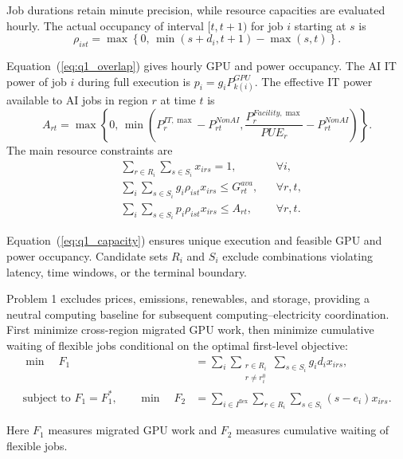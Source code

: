 Job durations retain minute precision, while resource capacities are evaluated hourly.
The actual occupancy of interval $[t,t+1)$ for job $i$ starting at $s$ is
\begin{equation}
	\rho_{ist}
	=
	\max\left\{
	0,\,
	\min(s+d_i,t+1)-\max(s,t)
	\right\}.
	\label{eq:q1_overlap}
\end{equation}

Equation~(\ref{eq:q1_overlap}) gives hourly GPU and power occupancy.
The AI IT power of job $i$ during full execution is
$p_i=g_iP^{GPU}_{k(i)}$.
The effective IT power available to AI jobs in region $r$ at time $t$ is
\[
A_{rt}
=
\max\left\{
0,\,
\min\left(
P^{IT,\max}_r-P^{NonAI}_{rt},
\frac{P^{Facility,\max}_r}{PUE_r}-P^{NonAI}_{rt}
\right)
\right\}.
\]
The main resource constraints are
\begin{equation}
	\begin{aligned}
		&\sum_{r\in R_i}\sum_{s\in S_i}x_{irs}=1,
		&&\forall i,\\
		&\sum_i\sum_{s\in S_i}
		g_i\rho_{ist}x_{irs}
		\leq G^{ava}_{rt},
		&&\forall r,t,\\
		&\sum_i\sum_{s\in S_i}
		p_i\rho_{ist}x_{irs}
		\leq A_{rt},
		&&\forall r,t .
	\end{aligned}
	\label{eq:q1_capacity}
\end{equation}

Equation~(\ref{eq:q1_capacity}) ensures unique execution and feasible GPU and power occupancy. Candidate sets $R_i$ and $S_i$ exclude combinations violating latency, time windows, or the terminal boundary.

Problem 1 excludes prices, emissions, renewables, and storage,
providing a neutral computing baseline for subsequent computing--electricity coordination.
First minimize cross-region migrated GPU work,
then minimize cumulative waiting of flexible jobs conditional on the optimal first-level objective:
\begin{equation}
	\begin{aligned}
		\min\quad
		F_1
		&=
		\sum_i
		\sum_{\substack{r\in R_i\\r\neq r_i^0}}
		\sum_{s\in S_i}
		g_id_ix_{irs},\\
        \text{subject to }F_1=F_1^{*}\text{,}\qquad
		\min\quad
		F_2
		&=
		\sum_{i\in I^{\mathrm{flex}}}
		\sum_{r\in R_i}\sum_{s\in S_i}
		(s-e_i)x_{irs}.
	\end{aligned}
	\label{eq:q1_objective}
\end{equation}

Here $F_1$ measures migrated GPU work and $F_2$ measures cumulative waiting of flexible jobs.


